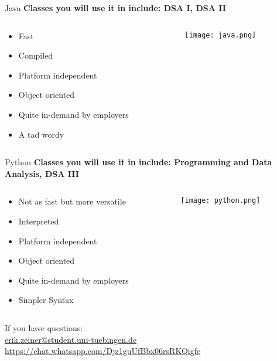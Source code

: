 \documentclass[aspectratio=169,hyperref={unicode}]{beamer}
\begin{document}
\begin{frame}{Java}
\textbf{Classes you will use it in include: DSA I, DSA II}

\begin{columns}
	\begin{column}{0.3\linewidth}
	\begin{itemize}
		\item Fast
		\item Compiled
		\item Platform independent
		\item Object oriented
		\item Quite in-demand by employers
		\item A tad wordy
	\end{itemize}
	\end{column}

	\begin{column}{0.7\linewidth}
	\begin{center}
			\texttt{[image: java.png]}
	\end{center}
	\end{column}
\end{columns}

\end{frame}

\begin{frame}{Python}
\textbf{Classes you will use it in include: Programming and Data Analysis, DSA III}

\begin{columns}
	\begin{column}{0.3\linewidth}
	\begin{itemize}
		\item Not as fast but more versatile
		\item Interpreted
		\item Platform independent
		\item Object oriented
		\item Quite in-demand by employers
		\item Simpler Syntax
	\end{itemize}
	\end{column}

	\begin{column}{0.7\linewidth}
	\begin{center}
			\texttt{[image: python.png]}
	\end{center}
	\end{column}
\end{columns}
\end{frame}

\begin{frame}
\begin{center}
		If you have questions: \\ \href{mailto:erik.zeiner@student.uni-tuebingen.de}{erik.zeiner@student.uni-tuebingen.de}
		\\
		\url{https://chat.whatsapp.com/Djz1guUfBbx06rsRKQigfe}
\end{center}
\end{frame}
\end{document}
